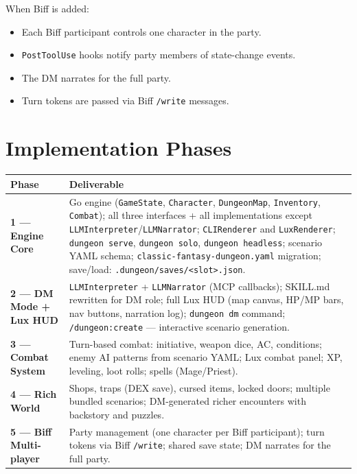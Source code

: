 \documentclass[a4paper,10pt]{article}
\newcommand{\cmd}[1]{\texttt{#1}}
\begin{document}
When Biff is added:

\begin{itemize}
  \item Each Biff participant controls one character in the party.
  \item \texttt{PostToolUse} hooks notify party members of
    state-change events.
  \item The DM narrates for the full party.
  \item Turn tokens are passed via Biff \cmd{/write} messages.
\end{itemize}

\section{Implementation Phases}

\begin{center}
\begin{tabular}{lp{10cm}}
\toprule
\textbf{Phase} & \textbf{Deliverable} \\
\midrule
\textbf{1 — Engine Core}
  & Go engine (\texttt{GameState}, \texttt{Character},
    \texttt{DungeonMap}, \texttt{Inventory}, \texttt{Combat});
    all three interfaces + all implementations except
    \texttt{LLMInterpreter}/\texttt{LLMNarrator};
    \texttt{CLIRenderer} and \texttt{LuxRenderer};
    \cmd{dungeon serve}, \cmd{dungeon solo}, \cmd{dungeon headless};
    scenario YAML schema;
    \texttt{classic-fantasy-dungeon.yaml} migration;
    save/load: \texttt{.dungeon/saves/<slot>.json}. \\
\midrule
\textbf{2 — DM Mode + Lux HUD}
  & \texttt{LLMInterpreter} + \texttt{LLMNarrator} (MCP callbacks);
    SKILL.md rewritten for DM role;
    full Lux HUD (map canvas, HP/MP bars, nav buttons, narration log);
    \cmd{dungeon dm} command;
    \cmd{/dungeon:create} --- interactive scenario generation. \\
\midrule
\textbf{3 — Combat System}
  & Turn-based combat: initiative, weapon dice, AC, conditions;
    enemy AI patterns from scenario YAML;
    Lux combat panel;
    XP, leveling, loot rolls;
    spells (Mage/Priest). \\
\midrule
\textbf{4 — Rich World}
  & Shops, traps (DEX save), cursed items, locked doors;
    multiple bundled scenarios;
    DM-generated richer encounters with backstory and puzzles. \\
\midrule
\textbf{5 — Biff Multi-player}
  & Party management (one character per Biff participant);
    turn tokens via Biff \cmd{/write};
    shared save state;
    DM narrates for the full party. \\
\bottomrule
\end{tabular}
\end{center}
\end{document}
